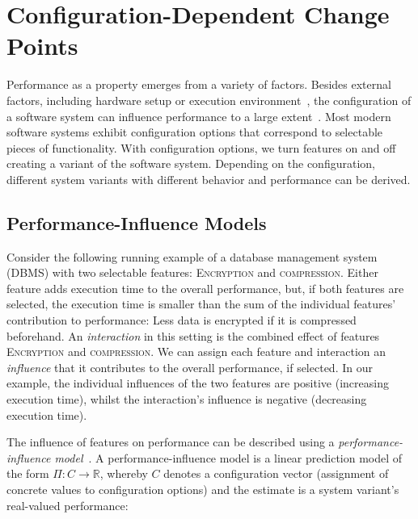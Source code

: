 \documentclass[sigconf]{acmart}
\begin{document}
	\section{Configuration-Dependent Change Points}
	Performance as a property emerges from a variety of factors.
	Besides external factors, including hardware setup or execution environment~\cite{ousterhout_always_2018}, the configuration  of a software system can influence performance to a large extent~\cite{siegmundPredictingPerformanceAutomated2012}.
	Most modern software systems exhibit configuration options that correspond to selectable pieces of functionality.
	With configuration options, we turn features on and off creating a variant of the software system.
	Depending on the configuration, different system variants with different behavior and performance can be derived.
	
	\subsection{Performance-Influence Models}\label{sec:pimodels}
	Consider the following running example of a database management system (DBMS) with two selectable features: \textsc{Encryption} and \textsc{compression}.
	Either feature adds execution time to the overall performance, but, if both features are selected, the execution time is smaller than the sum of the individual features' contribution to performance: Less data is encrypted if it is compressed beforehand.
	An \textit{interaction} in this setting is the combined effect of features \textsc{Encryption} and \textsc{compression}.
	We can assign each feature and interaction an \textit{influence} that it contributes to the overall performance, if selected. In our example, the individual influences of the two features are positive (increasing execution time), whilst the interaction's influence is negative (decreasing execution time).
	
	The influence of features on performance can be described using a \emph{performance-influence model}~\cite{siegmundPerformanceinfluenceModelsHighly2015}.
	A performance-influence model is a linear prediction model of the form $\Pi:C\rightarrow \mathbb{R}$, whereby $C$ denotes a configuration vector (assignment of concrete values to configuration options) and the estimate is a system variant's real-valued performance:
\end{document}
